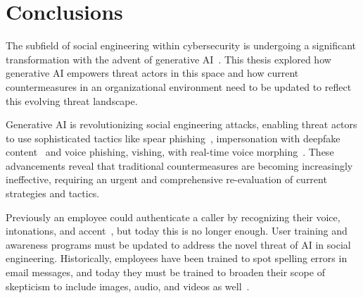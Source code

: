 

\chapter{Conclusions\label{chapter:conclusions}}
\begin{comment}
- Muistuta tutkimuskysymys
- Tärkeimmät tulokset ja perusteet
- Incident costs, numbers = impact
suositukset
- Anakyysia, vertailua, arviointia
- Ei turhia osioita, toistoa
- Puutteita kandissa? Mitä olisi hyvä vielä kertoa?’
- phishing by far the most loss causing cyberattack (fbi)
- calls to verified phone numbers (fbi), not relying on phone numbers on emails
- out of 880,418 fbi 298,878 were phishing 2023 (individuals, not organizations)
- more than half of organizations said they are passing the costs to customers ibm
- cybersecurity teams are constantly understaffed ibm
\end{comment}

The subfield of social engineering within cybersecurity is undergoing a significant transformation with the advent of generative AI~\citep{fakhouri_AI_Driven_Solutions_SE_Attacks_2024}. This thesis explored how generative AI empowers threat actors in this space and how current countermeasures in an organizational environment need to be updated to reflect this evolving threat landscape.

Generative AI is revolutionizing social engineering attacks, enabling threat actors to use sophisticated tactics like spear phishing~\citep{basit_Comprehensive_Survey_AI_Phishing_Detection_2021}, impersonation with deepfake content~\citep{mirsky_Creation_Detection_Deepfakes_2021} and voice phishing, vishing, with real-time voice morphing~\citep{doan_BTSE_Audio_Deepfake_Detection_2023}. These advancements reveal that traditional countermeasures are becoming increasingly ineffective, requiring an urgent and comprehensive re-evaluation of current strategies and tactics.

Previously an employee could authenticate a caller by recognizing their voice, intonations, and accent~\citep{mitnick_The_Art_of_Deception_2003}, but today this is no longer enough. User training and awareness programs must be updated to address the novel threat of AI in social engineering. Historically, employees have been trained to spot spelling errors in email messages, and today they must be trained to broaden their scope of skepticism to include images, audio, and videos as well~\citep{mirsky_Creation_Detection_Deepfakes_2021}.

